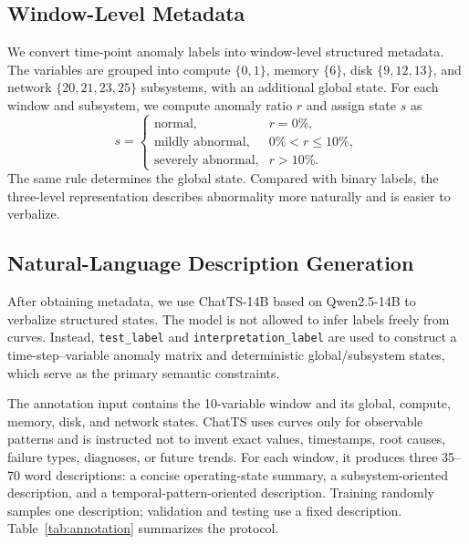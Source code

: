\documentclass[conference]{IEEEtran}
\begin{document}
\subsection{Window-Level Metadata}

We convert time-point anomaly labels into window-level structured metadata. The variables are grouped into compute $\{0,1\}$, memory $\{6\}$, disk $\{9,12,13\}$, and network $\{20,21,23,25\}$ subsystems, with an additional global state. For each window and subsystem, we compute anomaly ratio $r$ and assign state $s$ as
\begin{equation}
s=
\begin{cases}
\text{normal}, & r=0\%,\\
\text{mildly abnormal}, & 0\%<r\leq10\%,\\
\text{severely abnormal}, & r>10\%.
\end{cases}
\label{eq:state}
\end{equation}
The same rule determines the global state. Compared with binary labels, the three-level representation describes abnormality more naturally and is easier to verbalize.

\subsection{Natural-Language Description Generation}

After obtaining metadata, we use ChatTS-14B based on Qwen2.5-14B to verbalize structured states. The model is not allowed to infer labels freely from curves. Instead, \texttt{test\_label} and \texttt{interpretation\_label} are used to construct a time-step--variable anomaly matrix and deterministic global/subsystem states, which serve as the primary semantic constraints.

The annotation input contains the 10-variable window and its global, compute, memory, disk, and network states. ChatTS uses curves only for observable patterns and is instructed not to invent exact values, timestamps, root causes, failure types, diagnoses, or future trends. For each window, it produces three 35--70 word descriptions: a concise operating-state summary, a subsystem-oriented description, and a temporal-pattern-oriented description. Training randomly samples one description; validation and testing use a fixed description. Table~\ref{tab:annotation} summarizes the protocol.
\end{document}
